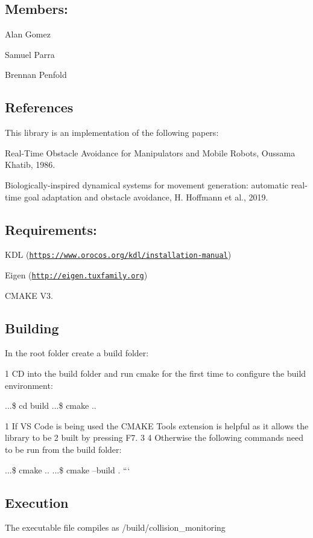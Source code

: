 \subsection*{Members\+:}


\begin{DoxyItemize}
\item Alan Gomez
\item Samuel Parra
\item Brennan Penfold
\end{DoxyItemize}

\subsection*{References}

This library is an implementation of the following papers\+:


\begin{DoxyItemize}
\item Real-\/\+Time Obstacle Avoidance for Manipulators and Mobile Robots, Oussama Khatib, 1986.
\item Biologically-\/inspired dynamical systems for movement generation\+: automatic real-\/time goal adaptation and obstacle avoidance, H. Hoffmann et al., 2019.
\end{DoxyItemize}

\subsection*{Requirements\+:}


\begin{DoxyItemize}
\item K\+DL (\href{https://www.orocos.org/kdl/installation-manual}{\tt https\+://www.\+orocos.\+org/kdl/installation-\/manual})
\item Eigen (\href{http://eigen.tuxfamily.org}{\tt http\+://eigen.\+tuxfamily.\+org})
\item C\+M\+A\+KE V3.
\end{DoxyItemize}

\subsection*{Building}

In the root folder create a build folder\+: 
\begin{DoxyCode}
1 CD into the build folder and run cmake for the first time to configure the build environment:
\end{DoxyCode}
 ...\$ cd build ...\$ cmake .. 
\begin{DoxyCode}
1 If VS Code is being used the CMAKE Tools extension is helpful as it allows the library to be
2 built by pressing F7.
3 
4 Otherwise the following commands need to be run from the build folder:
\end{DoxyCode}
 ...\$ cmake .. ...\$ cmake --build . ```

\subsection*{Execution}

The executable file compiles as /build/collision\+\_\+monitoring 